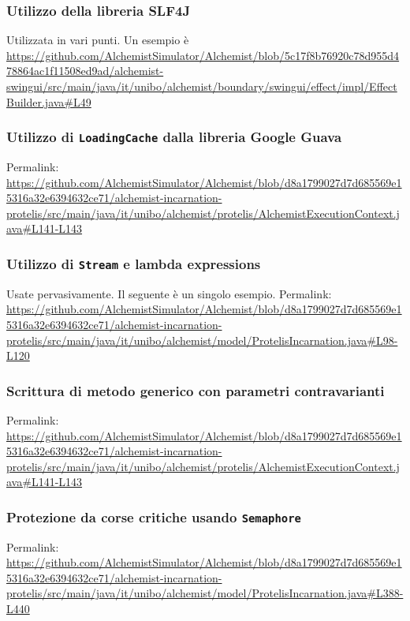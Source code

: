\documentclass[a4paper,12pt]{report}
\begin{document}
\begin{itemize}
\subsubsection{Utilizzo della libreria SLF4J}

Utilizzata in vari punti.
Un esempio è \url{https://github.com/AlchemistSimulator/Alchemist/blob/5c17f8b76920c78d955d478864ac1f11508ed9ad/alchemist-swingui/src/main/java/it/unibo/alchemist/boundary/swingui/effect/impl/EffectBuilder.java#L49}

\subsubsection{Utilizzo di \texttt{LoadingCache} dalla libreria Google Guava}

Permalink: \url{https://github.com/AlchemistSimulator/Alchemist/blob/d8a1799027d7d685569e15316a32e6394632ce71/alchemist-incarnation-protelis/src/main/java/it/unibo/alchemist/protelis/AlchemistExecutionContext.java#L141-L143}

\subsubsection{Utilizzo di \texttt{Stream} e lambda expressions}

Usate pervasivamente. Il seguente è un singolo esempio.
Permalink: \url{https://github.com/AlchemistSimulator/Alchemist/blob/d8a1799027d7d685569e15316a32e6394632ce71/alchemist-incarnation-protelis/src/main/java/it/unibo/alchemist/model/ProtelisIncarnation.java#L98-L120}

\subsubsection{Scrittura di metodo generico con parametri contravarianti}

Permalink: \url{https://github.com/AlchemistSimulator/Alchemist/blob/d8a1799027d7d685569e15316a32e6394632ce71/alchemist-incarnation-protelis/src/main/java/it/unibo/alchemist/protelis/AlchemistExecutionContext.java#L141-L143}

\subsubsection{Protezione da corse critiche usando \texttt{Semaphore}}

Permalink: \url{https://github.com/AlchemistSimulator/Alchemist/blob/d8a1799027d7d685569e15316a32e6394632ce71/alchemist-incarnation-protelis/src/main/java/it/unibo/alchemist/model/ProtelisIncarnation.java#L388-L440}



\end{itemize}
\end{document}
